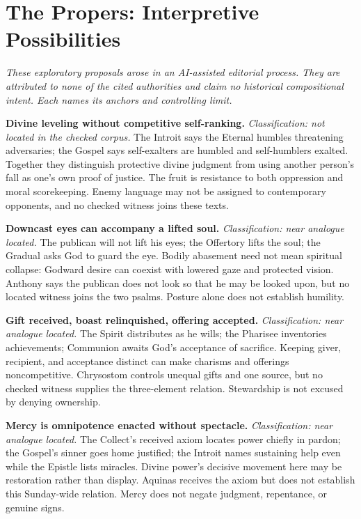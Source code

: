 \sectionguard
\section*{The Propers: Interpretive Possibilities}

\noindent\emph{These exploratory proposals arose in an AI-assisted editorial process. They are attributed to none of the cited authorities and claim no historical compositional intent. Each names its anchors and controlling limit.}

\noindent\textbf{Divine leveling without competitive self-ranking.\enspace{}}
\emph{Classification: not located in the checked corpus.} The Introit says the Eternal humbles threatening adversaries; the Gospel says self-exalters are humbled and self-humblers exalted. Together they distinguish protective divine judgment from using another person's fall as one's own proof of justice. The fruit is resistance to both oppression and moral scorekeeping. Enemy language may not be assigned to contemporary opponents, and no checked witness joins these texts.

\noindent\textbf{Downcast eyes can accompany a lifted soul.\enspace{}}
\emph{Classification: near analogue located.} The publican will not lift his eyes; the Offertory lifts the soul; the Gradual asks God to guard the eye. Bodily abasement need not mean spiritual collapse: Godward desire can coexist with lowered gaze and protected vision. Anthony says the publican does not look so that he may be looked upon, but no located witness joins the two psalms. Posture alone does not establish humility.

\noindent\textbf{Gift received, boast relinquished, offering accepted.\enspace{}}
\emph{Classification: near analogue located.} The Spirit distributes as he wills; the Pharisee inventories achievements; Communion awaits God's acceptance of sacrifice. Keeping giver, recipient, and acceptance distinct can make charisms and offerings noncompetitive. Chrysostom controls unequal gifts and one source, but no checked witness supplies the three-element relation. Stewardship is not excused by denying ownership.

\noindent\textbf{Mercy is omnipotence enacted without spectacle.\enspace{}}
\emph{Classification: near analogue located.} The Collect's received axiom locates power chiefly in pardon; the Gospel's sinner goes home justified; the Introit names sustaining help even while the Epistle lists miracles. Divine power's decisive movement here may be restoration rather than display. Aquinas receives the axiom but does not establish this Sunday-wide relation. Mercy does not negate judgment, repentance, or genuine signs.

